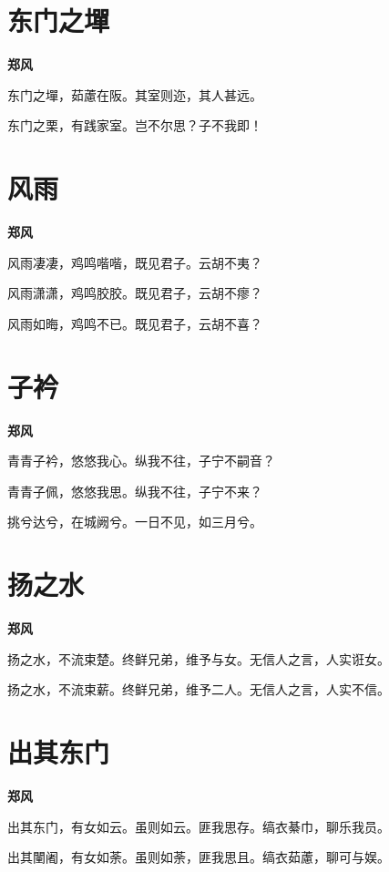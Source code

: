 \documentclass[12pt,a4paper]{ctexbook}
\begin{document}
\section{东门之墠}
\textbf{郑风}\par\vspace{0.5em}
东门之墠，茹藘在阪。其室则迩，其人甚远。\par
东门之栗，有践家室。岂不尔思？子不我即！\par

\section{风雨}
\textbf{郑风}\par\vspace{0.5em}
风雨凄凄，鸡鸣喈喈，既见君子。云胡不夷？\par
风雨潇潇，鸡鸣胶胶。既见君子，云胡不瘳？\par
风雨如晦，鸡鸣不已。既见君子，云胡不喜？\par

\section{子衿}
\textbf{郑风}\par\vspace{0.5em}
青青子衿，悠悠我心。纵我不往，子宁不嗣音？\par
青青子佩，悠悠我思。纵我不往，子宁不来？\par
挑兮达兮，在城阙兮。一日不见，如三月兮。\par

\section{扬之水}
\textbf{郑风}\par\vspace{0.5em}
扬之水，不流束楚。终鲜兄弟，维予与女。无信人之言，人实诳女。\par
扬之水，不流束薪。终鲜兄弟，维予二人。无信人之言，人实不信。\par

\section{出其东门}
\textbf{郑风}\par\vspace{0.5em}
出其东门，有女如云。虽则如云。匪我思存。缟衣綦巾，聊乐我员。\par
出其闉阇，有女如荼。虽则如荼，匪我思且。缟衣茹藘，聊可与娱。\par
\end{document}
